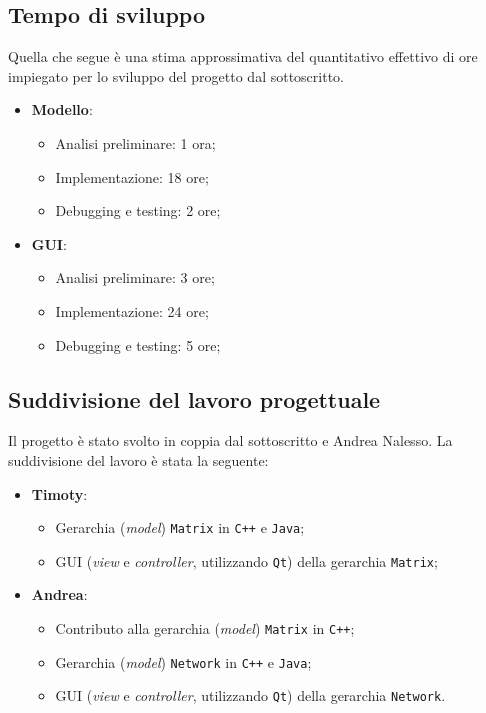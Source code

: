 \subsection{Tempo di sviluppo} 
Quella che segue è una stima approssimativa del 
quantitativo effettivo di ore impiegato per lo sviluppo del progetto dal sottoscritto.
\begin{itemize}
    \item \textbf{Modello}:
    \begin{itemize}
        \item Analisi preliminare: 1 ora;
        \item Implementazione: 18 ore;
        \item Debugging e testing: 2 ore;
    \end{itemize}
    \item \textbf{GUI}:
    \begin{itemize}
        \item Analisi preliminare: 3 ore;
        \item Implementazione: 24 ore;
        \item Debugging e testing: 5 ore;
    \end{itemize}
\end{itemize}

\subsection{Suddivisione del lavoro progettuale}
Il progetto è stato svolto in coppia dal sottoscritto e Andrea Nalesso. La suddivisione del 
lavoro è stata la seguente:
\begin{itemize}
    \item \textbf{Timoty}:
    \begin{itemize}
        \item Gerarchia (\emph{model}) \texttt{Matrix} in \texttt{C++} e \texttt{Java};
        \item GUI (\emph{view} e \emph{controller}, utilizzando \texttt{Qt}) della gerarchia \texttt{Matrix};
    \end{itemize}
    \item \textbf{Andrea}:
    \begin{itemize}
        \item Contributo alla gerarchia (\emph{model}) \texttt{Matrix} in \texttt{C++};
        \item Gerarchia (\emph{model}) \texttt{Network} in \texttt{C++} e \texttt{Java};
        \item GUI (\emph{view} e \emph{controller}, utilizzando \texttt{Qt}) della gerarchia \texttt{Network}.
    \end{itemize}
\end{itemize}

